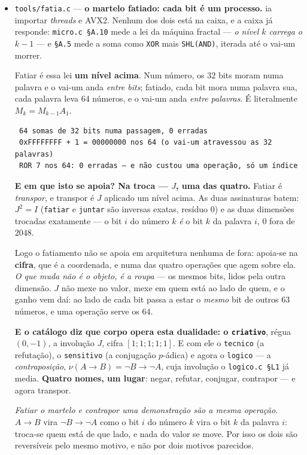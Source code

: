 \documentclass[11pt]{article}
\newcommand{\code}[1]{\texttt{\small #1}}
\theoremstyle{plain}
\theoremstyle{remark}
\begin{document}
\begin{itemize}
\item \code{tools/fatia.c} --- \textbf{o martelo fatiado: cada bit é um processo.} ia
importar \emph{threads} e AVX2. Nenhum dos dois está na caixa, e a caixa já responde:
\code{micro.c §A.10} mede a lei da máquina fractal --- \emph{o nível $k$ carrega o $k-1$} --- e
\code{§A.5} mede a soma como \code{XOR} mais \code{SHL(AND)}, iterada até o vai-um morrer.

Fatiar é essa lei \textbf{um nível acima}. Num número, os $32$ bits moram numa palavra e o vai-um
anda \emph{entre bits}; fatiado, cada bit mora numa palavra sua, cada palavra leva $64$ números, e
o vai-um anda \emph{entre palavras}. É literalmente $M_k = M_{k-1}A_1$.

\begin{verbatim}
 64 somas de 32 bits numa passagem, 0 erradas
 0xFFFFFFFF + 1 = 00000000 nos 64 (o vai-um atravessou as 32 palavras)
 ROR 7 nos 64: 0 erradas — e não custou uma operação, só um índice
\end{verbatim}

\textbf{E em que isto se apoia? Na troca --- $J$, uma das quatro.} Fatiar é \emph{transpor}, e
transpor é $J$ aplicado um nível acima. As duas assinaturas batem: $J^2 = I$ (\code{fatiar} e
\code{juntar} são inversas exatas, resíduo $0$) e as duas dimensões trocadas exatamente --- o bit
$i$ do número $k$ \emph{é} o bit $k$ da palavra $i$, $0$ fora de $2048$.

Logo o fatiamento não se apoia em arquitetura nenhuma de fora: apoia-se na \textbf{cifra}, que é a
coordenada, e numa das quatro operações que agem sobre ela. \emph{O que muda não é o objeto, é a
roupa} --- os mesmos bits, lidos pela outra dimensão. $J$ não mexe no valor, mexe em quem está ao
lado de quem, e o ganho vem daí: ao lado de cada bit passa a estar o \emph{mesmo} bit de outros
$63$ números, e uma operação serve os $64$.

\textbf{E o catálogo diz que corpo opera esta dualidade: o \code{criativo}}, régua $(0,-1)$, a
involução $J$, cifra $[1;1;1;1;1]$. E com ele o \code{tecnico} (a refutação), o \code{sensitivo}
(a conjugação $p$-ádica) e agora o \code{logico} --- a \emph{contraposição}, $\nu(A\to B) =
\neg B\to\neg A$, cuja involução o \code{logico.c §L1} já media. \textbf{Quatro nomes, um lugar}:
negar, refutar, conjugar, contrapor --- e agora transpor.

\emph{Fatiar o martelo e contrapor uma demonstração são a mesma operação.} $A\to B$ vira
$\neg B\to\neg A$ como o bit $i$ do número $k$ vira o bit $k$ da palavra $i$: troca-se quem está de
que lado, e nada do valor se move. Por isso os dois são reversíveis pelo mesmo motivo, e não por
dois motivos parecidos.


\end{itemize}
\end{document}
